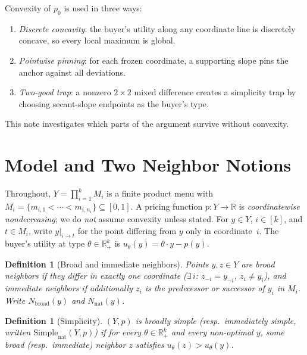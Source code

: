 \documentclass[11pt]{article}
\newtheorem{definition}[theorem]{Definition}
\newcommand{\R}{\mathbb{R}}
\newcommand{\Rp}{\R_+}
\newcommand{\Simplenat}{\mathrm{Simple}_{\mathrm{nat}}}
\begin{document}
Convexity of $p_0$ is used in three ways:
\begin{enumerate}[label=(\roman*)]
  \item \emph{Discrete concavity}: the buyer's utility along any
    coordinate line is discretely concave, so every local maximum is
    global.
  \item \emph{Pointwise pinning}: for each frozen coordinate, a
    supporting slope pins the anchor against all deviations.
  \item \emph{Two-good trap}: a nonzero $2 \times 2$ mixed difference
    creates a simplicity trap by choosing secant-slope endpoints as the
    buyer's type.
\end{enumerate}

This note investigates which parts of the argument survive without
convexity.

\section{Model and Two Neighbor Notions}\label{sec:neighbors}

Throughout, $Y = \prod_{i=1}^k M_i$ is a finite product menu with
$M_i = \{m_{i,1} < \cdots < m_{i,n_i}\} \subseteq [0,1]$.  A pricing
function $p \colon Y \to \R$ is \emph{coordinatewise nondecreasing};
we do \emph{not} assume convexity unless stated.  For $y \in Y$,
$i \in [k]$, and $t \in M_i$, write $y|_{i \to t}$ for the point
differing from $y$ only in coordinate~$i$.  The buyer's utility at
type $\theta \in \Rp^k$ is $u_\theta(y) = \theta \cdot y - p(y)$.

\begin{definition}[Broad and immediate neighbors]\label{def:neighbors}
Points $y, z \in Y$ are \emph{broad neighbors} if they differ in
exactly one coordinate ($\exists\, i$: $z_{-i} = y_{-i}$,
$z_i \neq y_i$), and \emph{immediate neighbors} if additionally
$z_i$ is the predecessor or successor of $y_i$ in $M_i$.  Write
$N_{\mathrm{broad}}(y)$ and $N_{\mathrm{nat}}(y)$.
\end{definition}

\begin{definition}[Simplicity]\label{def:simplicity}
$(Y, p)$ is \emph{broadly simple} (resp.\ \emph{immediately simple},
written $\Simplenat(Y, p)$) if for every $\theta \in \Rp^k$ and
every non-optimal $y$, some broad (resp.\ immediate) neighbor
$z$ satisfies $u_\theta(z) > u_\theta(y)$.
\end{definition}
\end{document}
